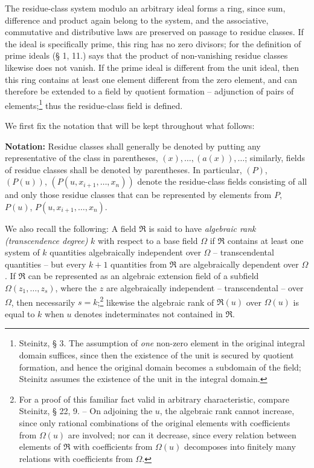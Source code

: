 \documentclass[11pt]{article}
\providecommand{\mR}{\mathfrak{R}}
\providecommand{\mR}{\mathfrak{R}}
\begin{document}
The residue-class system modulo an arbitrary ideal forms a ring, since sum, difference and product again belong to the system, and the associative, commutative and distributive laws are preserved on passage to residue classes. If the ideal is specifically prime, this ring has no zero divisors; for the definition of prime ideals (§ 1, 11.) says that the product of non-vanishing residue classes likewise does not vanish. If the prime ideal is different from the unit ideal, then this ring contains at least one element different from the zero element, and can therefore be extended to a field by quotient formation -- adjunction of pairs of elements;\footnote{Steinitz, § 3. The assumption of \emph{one} non-zero element in the original integral domain suffices, since then the existence of the unit is secured by quotient formation, and hence the original domain becomes a subdomain of the field; Steinitz assumes the existence of the unit in the integral domain.} thus the residue-class field is defined.

We first fix the notation that will be kept throughout what follows:

\textbf{Notation:} Residue classes shall generally be denoted by putting any representative of the class in parentheses, $(x),\ldots,(a(x)),\ldots$; similarly, fields of residue classes shall be denoted by parentheses. In particular, $(P)$, $(P(u))$, $(P(u,x_{i+1},\ldots,x_n))$ denote the residue-class fields consisting of all and only those residue classes that can be represented by elements from $P$, $P(u)$, $P(u,x_{i+1},\ldots,x_n)$.

We also recall the following: A field $\mR$ is said to have \emph{algebraic rank (transcendence degree)} $k$ with respect to a base field $\Omega$ if $\mR$ contains at least one system of $k$ quantities algebraically independent over $\Omega$ -- transcendental quantities -- but every $k+1$ quantities from $\mR$ are algebraically dependent over $\Omega$. If $\mR$ can be represented as an algebraic extension field of a subfield $\Omega(z_1,\ldots,z_s)$, where the $z$ are algebraically independent -- transcendental -- over $\Omega$, then necessarily $s=k$;\footnote{For a proof of this familiar fact valid in arbitrary characteristic, compare Steinitz, § 22, 9. -- On adjoining the $u$, the algebraic rank cannot increase, since only rational combinations of the original elements with coefficients from $\Omega(u)$ are involved; nor can it decrease, since every relation between elements of $\mR$ with coefficients from $\Omega(u)$ decomposes into finitely many relations with coefficients from $\Omega$.} likewise the algebraic rank of $\mR(u)$ over $\Omega(u)$ is equal to $k$ when $u$ denotes indeterminates not contained in $\mR$.
\end{document}
